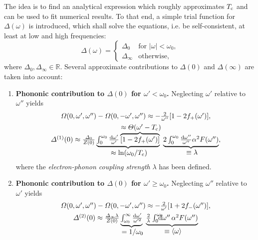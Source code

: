The idea is to find an analytical expression which roughly approximates $T \sb{\text{c}}$ and can be used to fit numerical results. To that end, a simple trial
function for $\Delta(\omega)$ is introduced, which shall solve the
 equations, i.e. be self-consistent, at least at low and high
frequencies:
%
\begin{equation*}
    \Delta(\omega) = \begin{cases}
        \Delta_0 & \text{for $|\omega| < \omega_0$,} \\
        \Delta_\infty & \text{otherwise,}
    \end{cases}
\end{equation*}
%
where $\Delta_0, \Delta_\infty \in \mathds R$. Several approximate contributions
to $\Delta(0)$ and $\Delta(\infty)$ are taken into account:
%
\begin{enumerate}
    \item \textbf{Phononic contribution to \bm$\Delta(0)$ for \bm$\omega' <
    \omega_0$.} Neglecting $\omega'$ relative to $\omega''$ yields
    \begin{gather*}
        \Omega(0, \omega', \omega'') - \Omega(0, -\omega', \omega'')
        \approx -\frac 2 {\omega''} [1 - 2 f_+(\omega')],
        \\
        \Delta^{(1)}(0) \approx \frac{\Delta_0}{Z(0)}
        \hypo
            {\int_0^{\omega_0} \frac{\D \omega'}{\omega'}
            \hyper{[1 - 2 f_+(\omega')]}{\approx \Theta(\omega' - T \sub c)}}
            {\approx \ln(\omega_0 / T \sub c)} \
        \hypo
            {2 \int_0^{\omega_0} \frac{\D \omega''}{\omega''}
            \alpha^2 F(\omega'')}{\equiv \lambda},
    \end{gather*}
    where the \emph{electron-phonon coupling strength} $\lambda$ has been
    defined.
    \item \textbf{Phononic contribution to \bm$\Delta(0)$ for \bm$\omega' \geq
    \omega_0$.} Neglecting $\omega''$ relative to $\omega'$ yields
    \begin{gather*}
        \Omega(0, \omega', \omega'') - \Omega(0, -\omega', \omega'')
        \approx -\frac 2 {\omega'} [1 + 2 f_-(\omega'')],
        \\
        \Delta^{(2)}(0) \approx \frac{\Delta_\infty \lambda}{Z(0)}
        \hypo
            {\int_{\omega_0}^\infty \frac{\D \omega'}{\omega'^2}}
            {= 1 / \omega_0} \
        \hypo
            {\frac 2 \lambda \int \from 0 \till{\omega_0} \D \omega'' \,
            \alpha^2 F(\omega'')}{\equiv \av \omega}

\end{gather*}
\end{enumerate}

